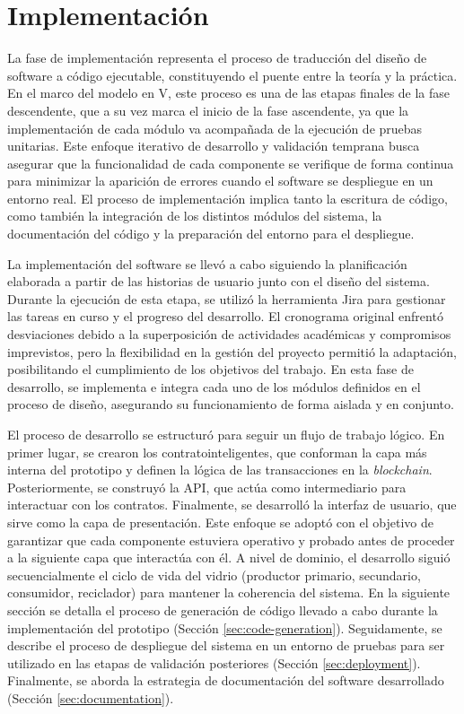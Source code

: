 \chapter[Implementación]{Implementación}
\label{cp:implementation}

\parindent0pt

La fase de implementación representa el proceso de traducción del diseño de \gls{software} a código ejecutable, constituyendo el puente entre la teoría y la práctica. En el marco del modelo en V, este proceso es una de las etapas finales de la fase descendente, que a su vez marca el inicio de la fase ascendente, ya que la implementación de cada módulo va acompañada de la ejecución de pruebas unitarias. Este enfoque iterativo de desarrollo y validación temprana busca asegurar que la funcionalidad de cada componente se verifique de forma continua para minimizar la aparición de errores cuando el software se despliegue en un entorno real. El proceso de implementación implica tanto la escritura de código, como también la integración de los distintos módulos del sistema, la documentación del código y la preparación del entorno para el despliegue.

La implementación del software se llevó a cabo siguiendo la planificación elaborada a partir de las historias de usuario junto con el diseño del sistema. Durante la ejecución de esta etapa, se utilizó la herramienta Jira para gestionar las tareas en curso y el progreso del desarrollo. El cronograma original enfrentó desviaciones debido a la superposición de actividades académicas y compromisos imprevistos, pero la flexibilidad en la gestión del proyecto permitió la adaptación, posibilitando el cumplimiento de los objetivos del trabajo. En esta fase de desarrollo, se implementa e integra cada uno de los módulos definidos en el proceso de diseño, asegurando su funcionamiento de forma aislada y en conjunto.

El proceso de desarrollo se estructuró para seguir un flujo de trabajo lógico. En primer lugar, se crearon los \glspl{contratointeligente}, que conforman la capa más interna del prototipo y definen la lógica de las transacciones en la \textit{blockchain}. Posteriormente, se construyó la API, que actúa como intermediario para interactuar con los contratos. Finalmente, se desarrolló la interfaz de usuario, que sirve como la capa de presentación. Este enfoque se adoptó con el objetivo de garantizar que cada componente estuviera operativo y probado antes de proceder a la siguiente capa que interactúa con él. A nivel de dominio, el desarrollo siguió secuencialmente el ciclo de vida del vidrio (productor primario, secundario, consumidor, reciclador) para mantener la coherencia del sistema. En la siguiente sección se detalla el proceso de generación de código llevado a cabo durante la implementación del prototipo (Sección \ref{sec:code-generation}). Seguidamente, se describe el proceso de despliegue del sistema en un entorno de pruebas para ser utilizado en las etapas de validación posteriores (Sección \ref{sec:deployment}). Finalmente, se aborda la estrategia de documentación del software desarrollado (Sección \ref{sec:documentation}).

